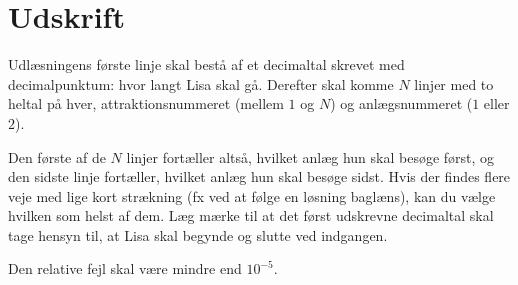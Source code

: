 \section*{Udskrift}
Udlæsningens første linje skal bestå af et decimaltal skrevet med decimalpunktum: hvor langt Lisa skal gå. 
Derefter skal komme $N$ linjer med to heltal på hver, attraktionsnummeret (mellem $1$ og $N$) og anlægsnummeret ($1$ eller $2$).

Den første af de $N$ linjer fortæller altså, hvilket anlæg hun skal besøge først, og den sidste linje fortæller, hvilket anlæg hun skal besøge sidst.
Hvis der findes flere veje med lige kort strækning (fx ved at følge en løsning baglæns), kan du vælge hvilken som helst af dem.
Læg mærke til at det først udskrevne decimaltal skal tage hensyn til, at Lisa skal begynde og slutte ved indgangen.

Den relative fejl skal være mindre end $10^{-5}$.
